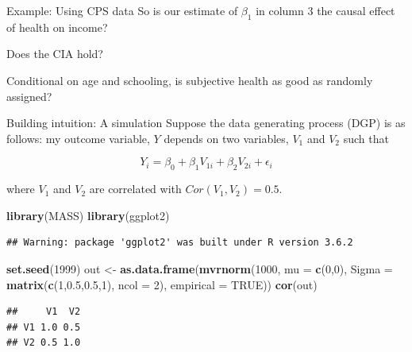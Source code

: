 \documentclass[
  ignorenonframetext,
]{beamer}
\newenvironment{Shaded}{\begin{snugshade}}{\end{snugshade}}
\newcommand{\DataTypeTok}[1]{\textcolor[rgb]{0.13,0.29,0.53}{#1}}
\newcommand{\DecValTok}[1]{\textcolor[rgb]{0.00,0.00,0.81}{#1}}
\newcommand{\FloatTok}[1]{\textcolor[rgb]{0.00,0.00,0.81}{#1}}
\newcommand{\KeywordTok}[1]{\textcolor[rgb]{0.13,0.29,0.53}{\textbf{#1}}}
\newcommand{\NormalTok}[1]{#1}
\newcommand{\OtherTok}[1]{\textcolor[rgb]{0.56,0.35,0.01}{#1}}
\newcommand{\StringTok}[1]{\textcolor[rgb]{0.31,0.60,0.02}{#1}}
\begin{document}
\begin{frame}{Example: Using CPS data}
\protect\hypertarget{example-using-cps-data-8}{}
So is our estimate of \(\beta_1\) in column 3 the causal effect of
health on income?

Does the CIA hold?

Conditional on age and schooling, is subjective health as good as
randomly assigned?
\end{frame}

\begin{frame}[fragile]{Building intuition: A simulation}
\protect\hypertarget{building-intuition-a-simulation}{}
Suppose the data generating process (DGP) is as follows: my outcome
variable, \(Y\) depends on two variables, \(V_1\) and \(V_2\) such that

\[
Y_i=\beta_0+\beta_1 V_{1i}+\beta_2 V_{2i}+\epsilon_i
\]

where \(V_1\) and \(V_2\) are correlated with \(Cor(V_1,V_2)=0.5\).

\tiny

\begin{Shaded}
\begin{Highlighting}[]
\KeywordTok{library}\NormalTok{(MASS)}
\KeywordTok{library}\NormalTok{(ggplot2)}
\end{Highlighting}
\end{Shaded}

\begin{verbatim}
## Warning: package 'ggplot2' was built under R version 3.6.2
\end{verbatim}

\begin{Shaded}
\begin{Highlighting}[]
\KeywordTok{set.seed}\NormalTok{(}\DecValTok{1999}\NormalTok{)}
\NormalTok{out \textless{}{-}}\StringTok{ }\KeywordTok{as.data.frame}\NormalTok{(}\KeywordTok{mvrnorm}\NormalTok{(}\DecValTok{1000}\NormalTok{, }\DataTypeTok{mu =} \KeywordTok{c}\NormalTok{(}\DecValTok{0}\NormalTok{,}\DecValTok{0}\NormalTok{), }
                     \DataTypeTok{Sigma =} \KeywordTok{matrix}\NormalTok{(}\KeywordTok{c}\NormalTok{(}\DecValTok{1}\NormalTok{,}\FloatTok{0.5}\NormalTok{,}\FloatTok{0.5}\NormalTok{,}\DecValTok{1}\NormalTok{), }\DataTypeTok{ncol =} \DecValTok{2}\NormalTok{), }
                     \DataTypeTok{empirical =} \OtherTok{TRUE}\NormalTok{))}
\KeywordTok{cor}\NormalTok{(out)}
\end{Highlighting}
\end{Shaded}

\begin{verbatim}
##     V1  V2
## V1 1.0 0.5
## V2 0.5 1.0
\end{verbatim}

\normalsize
\end{frame}
\end{document}
